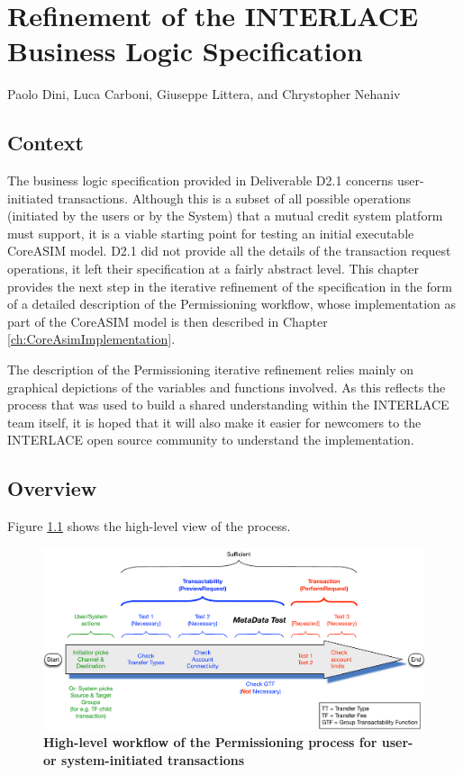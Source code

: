 \chapter{Refinement of the INTERLACE Business Logic Specification}
\label{ch:UpdateBLS}

\vspace{-1cm}
\begin{center}
Paolo Dini, Luca Carboni, Giuseppe Littera, and Chrystopher Nehaniv
\end{center}

\section{Context}
The business logic specification provided in Deliverable D2.1 \cite{INTERLACE_D21} concerns user-initiated transactions. Although this is a subset of all possible operations (initiated by the users or by the System) that a mutual credit system platform must support, it is a viable starting point for testing an initial executable CoreASIM model. D2.1 did not provide all the details of the transaction request operations, it left their specification at a fairly abstract level. This chapter provides the next step in the iterative refinement of the specification in the form of a detailed description of the Permissioning workflow, whose implementation as part of the CoreASIM model is then described in Chapter \ref{ch:CoreAsimImplementation}.

The description of the Permissioning iterative refinement relies mainly on graphical depictions of the variables and functions involved. As this reflects the process that was used to build a shared understanding within the INTERLACE team itself, it is hoped that it will also make it easier for newcomers to the INTERLACE open source community to understand the implementation.

\section{Overview}
Figure \ref{transactabilitywkflow} shows the high-level view of the process.

\begin{figure}[htbp]
\centering
\includegraphics[width=16cm]{Figures/Transactability_Workflow}
\caption{\small\textbf{High-level workflow of the Permissioning process for user- or system-initiated transactions}}
\label{transactabilitywkflow}
\end{figure}






